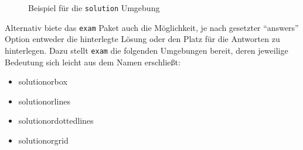 \begin{figure}
\caption{Beispiel für die \texttt{solution} Umgebung}\label{fig:sol2}
\end{figure}

Alternativ biete das \texttt{exam} Paket auch die Möglichkeit, je nach gesetzter \enquote{answers} Option entweder die hinterlegte Lösung oder den Platz für die Antworten zu hinterlegen. Dazu stellt \texttt{exam} die folgenden Umgebungen bereit, deren jeweilige Bedeutung sich leicht aus dem Namen erschließt:

\begin{itemize}
	\item solutionorbox
	\item solutionorlines
	\item solutionordottedlines
	\item solutionorgrid
\end{itemize}

